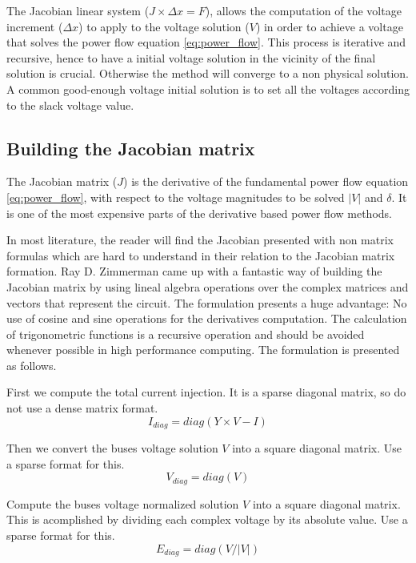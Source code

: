 \documentclass[nols,a4paper,twoside,notoc,fleqn]{tufte-book}
\begin{document}
The Jacobian linear system ($J \times \Delta x = F$), allows the computation of the voltage increment ($\Delta x$) to apply to the voltage solution ($V$) in order to achieve a voltage that solves the power flow equation \ref{eq:power_flow}. This process is iterative and recursive, hence to have a initial voltage solution in the vicinity of the final solution is crucial. Otherwise the method will converge to a non physical solution. A common good-enough voltage initial solution is to set all the voltages according to the slack voltage value.


\subsection{Building the Jacobian matrix} \label{Jacobian_chapter}

The Jacobian matrix ($J$) is the derivative of the fundamental power flow equation \ref{eq:power_flow}, with respect to the voltage magnitudes to be solved $|V|$ and $\delta$. It is one of the most expensive parts of the derivative based power flow methods.

In most literature, the reader will find the Jacobian presented with non matrix formulas which are hard to understand in their relation to the Jacobian matrix formation. Ray D. Zimmerman came up with a fantastic way of building the Jacobian matrix \cite{zimmerman2010ac} by using lineal algebra operations over the complex matrices and vectors that represent the circuit. The formulation presents a huge advantage: No use of cosine and sine operations for the derivatives computation. The calculation of trigonometric functions is a recursive operation and should be avoided whenever possible in high performance computing. The formulation is presented as follows.

First we compute the total current injection. It is a sparse diagonal matrix, so do not use a dense matrix format.
\begin{equation}
I_{diag} = diag(Y \times V - I)
\end{equation}

Then we convert the buses voltage solution $V$ into a square diagonal matrix. Use a sparse format for this.
\begin{equation}
V_{diag} = diag(V)
\end{equation}

Compute the buses voltage normalized solution $V$ into a square diagonal matrix. This is acomplished by dividing each complex voltage by its absolute value. Use a sparse format for this.
\begin{equation}
E_{diag} = diag(V / |V|)
\end{equation}
\end{document}
